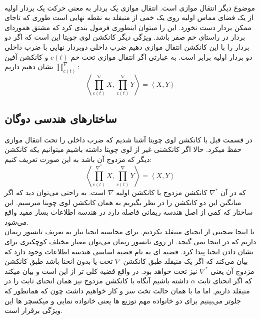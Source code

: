 \\
موضوع دیگر انتقال موازی است. انتقال موازی یک بردار به معنی حرکت یک بردار اولیه از یک فضای مماس اولیه روی یک خمی از منیفلد به نقطه نهایی است طوری که تاجای ممکن بردار دست نخورد. این را میتوان اینطوری فرمول بندی کرد که مشتق هموردای بردار در راستای خم صفر باشد. ویژگی دیگر کانکشن لوی چویتا این است که اگر دو بردار را با این کانکشن انتقال موازی دهیم ضرب داخلی دوبردار نهایی با ضرب داخلی دو بردار اولیه برابر است. به عبارتی اگر انتقال موازی تحت خم $c(t)$ و کانکشن آفین $\prod^\nabla_{c(t)}$ نشان دهیم داریم:
\begin{equation}
    \left\langle \prod^\nabla_{c(t)} X, \prod^\nabla_{c(t)} Y\right\rangle=     \left\langle X,  Y\right\rangle
\end{equation}

\subsection{ساختارهای هندسی دوگان}
در قسمت قبل با کانکشن لوی چویتا آشنا شدیم که ضرب داخلی را تحت انتقال موازی حفظ میکرد. حالا اگر کانکشنی غیر از لوی چویتا داشته باشیم میتوانیم یکه کانکشن دیگر که مزدوج آن باشد به این صورت تعریف کنیم:
\begin{equation}
    \left\langle \prod^{\nabla^*}_{c(t)} X, \prod^\nabla_{c(t)} Y\right\rangle=     \left\langle X,  Y\right\rangle
\end{equation}
که در آن $\nabla^*$ کانکشن مزدوج با کانکشن اولیه $\nabla$ است. به راحتی می‌توان دید که اگر میانگین این دو کانکشن را در نظر بگیریم به همان کانکشن لوی چویتا میرسیم. این ساختار که کمی از اصل هندسه ریمانی فاصله دارد در هندسه اطلاعات بسار مفید واقع می‌شود.\\
تا اینجا صحبتی از انحنای منیفلد نکردیم. برای محاسبه انحنا نیاز به تعریف تانسور ریمان داریم که در اینجا نمی گنجد. از روی تانسور ریمان می‌توان معیار مختلف کوچکتری برای نشان دادن انحنا پیدا کرد. قضیه ای به نام قضیه اساسی هندسه اطلاعات وجود دارد که بیان می‌کند که اگر یک منیفلد طبق کانکشن $\nabla$ تخت یا بدون انحنا باشد طبق کانکشن مزدوج آن یعنی $\nabla^*$ نیز تخت خواهد بود. در واقع قضیه کلی تر از این است و بیان میکند که اگر انحنای ثابت $\alpha$ داشته باشیم آنگاه با کانکشن مزدوج نیز همان انحنای ثابت را در منیفلد داریم, اما ما با همان حالت تخت سر و کار خواهیم داشت چون که همانطور که جلوتر می‌بینیم برای دو خانواده مهم توزیع ها یعنی خانواده نمایی و میکسچر ها این ویژگی برقرار است.
